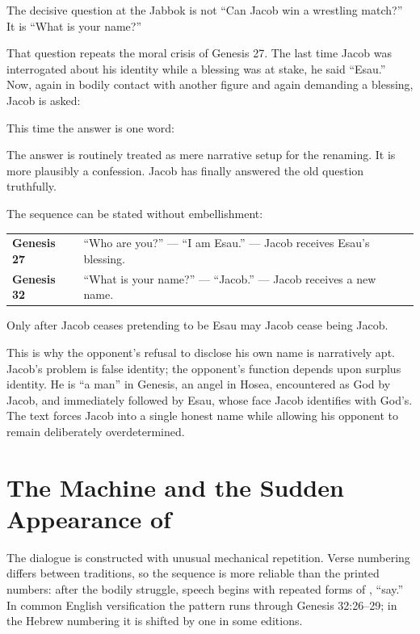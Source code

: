 The decisive question at the Jabbok is not ``Can Jacob win a wrestling match?'' It is ``What is your name?''

That question repeats the moral crisis of Genesis 27. The last time Jacob was interrogated about his identity while a blessing was at stake, he said ``Esau.'' Now, again in bodily contact with another figure and again demanding a blessing, Jacob is asked:


This time the answer is one word:


The answer is routinely treated as mere narrative setup for the renaming. It is more plausibly a confession. Jacob has finally answered the old question truthfully.

The sequence can be stated without embellishment:

\begin{center}
\begin{tabularx}{0.88\textwidth}{@{}>{\bfseries}p{}X@{}}
\toprule
Genesis 27 & ``Who are you?'' --- ``I am Esau.'' --- Jacob receives Esau's blessing.\\
Genesis 32 & ``What is your name?'' --- ``Jacob.'' --- Jacob receives a new name.\\
\bottomrule
\end{tabularx}
\end{center}

Only after Jacob ceases pretending to be Esau may Jacob cease being Jacob.

This is why the opponent's refusal to disclose his own name is narratively apt. Jacob's problem is false identity; the opponent's function depends upon surplus identity. He is ``a man'' in Genesis, an angel in Hosea, encountered as God by Jacob, and immediately followed by Esau, whose face Jacob identifies with God's. The text forces Jacob into a single honest name while allowing his opponent to remain deliberately overdetermined.

\section{The  Machine and the Sudden Appearance of }

The dialogue is constructed with unusual mechanical repetition. Verse numbering differs between traditions, so the sequence is more reliable than the printed numbers: after the bodily struggle, speech begins with repeated forms of , ``say.'' In common English versification the pattern runs through Genesis 32:26--29; in the Hebrew numbering it is shifted by one in some editions.

